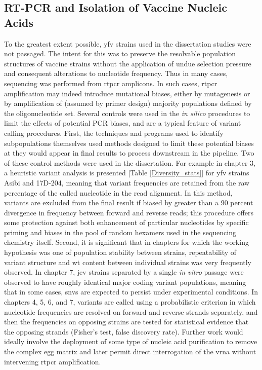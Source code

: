 \subsection{RT-PCR and Isolation of Vaccine Nucleic Acids}
To the greatest extent possible, \gls{yfv} strains used in the dissertation studies were not passaged. The intent for this was to preserve the resolvable population structures of vaccine strains without the application of undue selection pressure and consequent alterations to nucleotide frequency. Thus in many cases, sequencing was performed from \gls{rtpcr} amplicons. In such cases, \gls{rtpcr} amplification may indeed introduce mutational biases, either by mutagenesis or by amplification of (assumed by primer design) majority populations defined by the oligonucleotide set. Several controls were used in the \emph{in silico} procedures to limit the effects of potential PCR biases, and are a typical feature of variant calling procedures. First, the techniques and programs used to identify subpopulations themselves used methods designed to limit these potential biases at they would appear in final results to process downstream in the pipeline. Two of these control methods were used in the dissertation. For example in chapter 3, a heuristic variant analysis is presented [Table \ref{Diversity_stats}] for \gls{yfv} strains Asibi and 17D-204, meaning that variant frequencies are retained from the raw percentage of the called nucleotide in the read alignment. In this method, variants are excluded from the final result if biased by greater than a 90 percent divergence in frequency between forward and reverse reads; this procedure offers some protection against both enhancement of particular nucleotides by specific priming and biases in the pool of random hexamers used in the sequencing chemistry itself. Second, it is significant that in chapters for which the working hypothesis was one of population stability between strains, repeatability of variant structure and \gls{wt} content between individual strains was very frequently observed. In chapter 7, \gls{jev} strains separated by a single \emph{in vitro} passage were observed to have roughly identical major coding variant populations, meaning that in some cases, \glspl{snv} are expected to persist under experimental conditions. In chapters 4, 5, 6, and 7, variants are called using a probabilistic criterion in which nucleotide frequencies are resolved on forward and reverse strands separately, and then the frequencies on opposing strains are tested for statistical evidence that the opposing strands  (Fisher’s test, false discovery rate). Further work would ideally involve the deployment of some type of nucleic acid purification to remove the complex egg matrix and later permit direct interrogation of the \gls{vrna} without intervening \gls{rtpcr} amplification.
